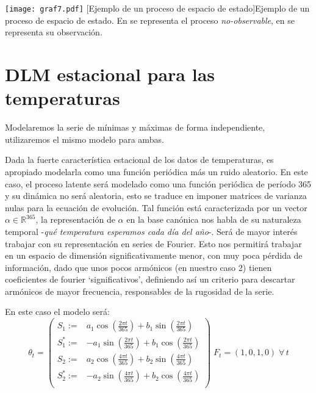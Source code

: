 \documentclass{article}
\newcommand{\RR}{\mathbb{R}}
\begin{document}
\newcommand{\thetaline}{\raisebox{2pt}{\tikz{\draw[-,theta,-,line width = 0.9pt](0,0) -- (5mm,0); }}\;}
\newcommand{\yeline}{\raisebox{2pt}{\tikz{\draw[-,ye,-,line width = 0.9pt](0,0) -- (5mm,0); }}\;}

\begin{center}
\texttt{[image: graf7.pdf]}
\vspace{-.75em}
[Ejemplo de un proceso de espacio de estado]{Ejemplo de un proceso de espacio de estado. En \thetaline se representa el proceso \textit{no-observable}, en \yeline se representa su observación.}
\label{fig:graf7}
\end{center}

\section{DLM estacional para las temperaturas}

Modelaremos la serie de mínimas y máximas de forma independiente, utilizaremos el mismo modelo para ambas.

Dada la fuerte característica estacional de los datos de temperaturas, es apropiado modelarla como una función periódica más un ruido aleatorio. En este caso, el proceso latente será modelado como una función periódica de período 365 y su dinámica no será aleatoria, esto se traduce en imponer matrices de varianza nulas para la ecuación de evolución.
Tal función está caracterizada por un vector $\alpha \in \RR^{365}$, la representación de $\alpha$ en la base canónica nos habla de su naturaleza temporal -\textit{qué temperatura esperamos cada día del año}-. Será de mayor interés trabajar con su representación en series de Fourier. Esto nos permitirá trabajar en un espacio de dimensión significativamente menor, con muy poca pérdida de información, dado que unos pocos armónicos (en nuestro caso 2) tienen coeficientes de fourier `significativos', definiendo así un criterio para descartar armónicos de mayor frecuencia, responsables de la rugosidad de la serie.

En este caso el modelo será:
$$\theta_t=\left(\begin{array}{lr}
S_1:=& a_1\cos\left(\frac{2\pi t}{365}\right) + b_1 \sin\left(\frac{2\pi t}{365}\right) \\
S_1^*:=& -a_1\sin\left(\frac{2\pi t}{365}\right) + b_1 \cos\left(\frac{2\pi t}{365}\right) \\
S_2:= &a_2\cos\left(\frac{4\pi t}{365}\right) + b_2 \sin\left(\frac{4\pi t}{365}\right) \\
S_2^*:=& -a_2\sin\left(\frac{4\pi t}{365}\right) + b_2 \cos\left(\frac{4\pi t}{365}\right) \\
\end{array}\right)\; F_t=(1,0,1,0) \; \forall \, t$$
\end{document}
